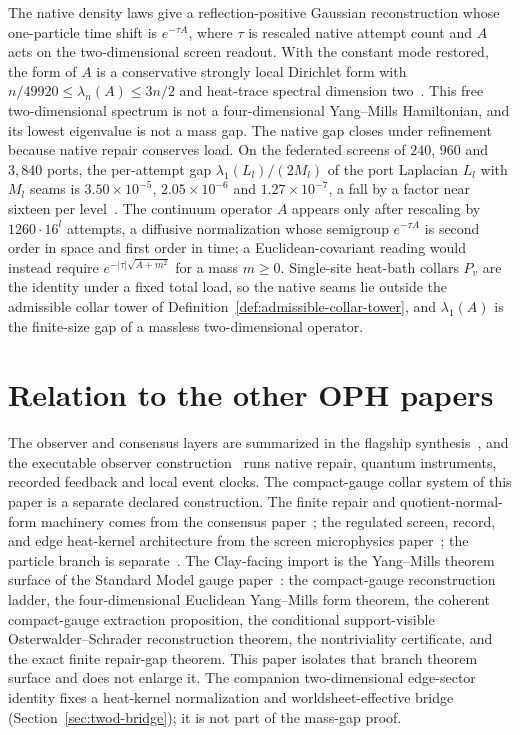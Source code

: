 \documentclass[11pt]{article}
\numberwithin{equation}{section}
\theoremstyle{remark}
\begin{document}
The native density laws give a reflection-positive Gaussian reconstruction
whose one-particle time shift is \(e^{-\tau A}\), where \(\tau\) is rescaled
native attempt count and \(A\) acts on the two-dimensional screen readout.
With the constant mode restored, the form of \(A\) is a conservative
strongly local Dirichlet form with \(n/49920\le\lambda_n(A)\le3n/2\) and
heat-trace spectral dimension two~\cite{ophcontinuum,ophtimefields}. This
free two-dimensional spectrum is not a four-dimensional Yang--Mills
Hamiltonian, and its lowest eigenvalue is not a mass gap. The native gap
closes under refinement because native repair conserves load. On the
federated screens of \(240\), \(960\) and \(3{,}840\) ports, the per-attempt
gap \(\lambda_1(L_l)/(2M_l)\) of the port Laplacian \(L_l\) with \(M_l\)
seams is \(3.50\times10^{-5}\), \(2.05\times10^{-6}\) and
\(1.27\times10^{-7}\), a fall by a factor near sixteen per
level~\cite{ophfedscaling}. The continuum operator \(A\) appears only after
rescaling by \(1260\cdot16^l\) attempts, a diffusive normalization whose
semigroup \(e^{-\tau A}\) is second order in space and first order in time; a
Euclidean-covariant reading would instead require
\(e^{-|\tau|\sqrt{A+m^2}}\) for a mass \(m\ge0\). Single-site heat-bath
collars \(P_v\) are the identity under a fixed total load, so the native
seams lie outside the admissible collar tower of
Definition~\ref{def:admissible-collar-tower}, and \(\lambda_1(A)\) is the
finite-size gap of a massless two-dimensional operator.

\section{Relation to the other OPH papers}

The observer and consensus layers are summarized in the flagship
synthesis~\cite{oph1}, and the executable observer
construction~\cite{ophmodel} runs native repair, quantum instruments,
recorded feedback and local event clocks. The compact-gauge collar system of
this paper is a separate declared construction. The finite repair and
quotient-normal-form machinery comes from the consensus
paper~\cite{oph4}; the regulated screen, record, and edge heat-kernel
architecture from the screen microphysics paper~\cite{oph5}; the particle
branch is separate~\cite{oph3}. The Clay-facing import is the Yang--Mills
theorem surface of the Standard Model gauge paper~\cite{oph2}: the
compact-gauge reconstruction ladder, the four-dimensional Euclidean
Yang--Mills form theorem, the coherent compact-gauge extraction proposition,
the conditional support-visible Osterwalder--Schrader reconstruction theorem,
the nontriviality certificate, and the exact finite repair-gap theorem. This
paper isolates that branch theorem surface and does not enlarge it. The
companion two-dimensional edge-sector identity fixes a heat-kernel
normalization and worldsheet-effective bridge
(Section~\ref{sec:twod-bridge}); it is not part of the mass-gap proof.
\end{document}
